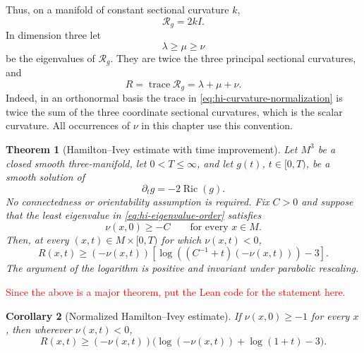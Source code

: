 \documentclass[10pt]{coll-l}
\newcommand{\trace}{\operatorname{trace}}
\newtheorem{theorem}{Theorem}[chapter]
\newtheorem{corollary}[theorem]{Corollary}
\theoremstyle{definition}
\theoremstyle{remark}
\numberwithin{section}{chapter}
\numberwithin{equation}{chapter}
\newcommand{\Ric}{\operatorname{Ric}}
\begin{document}
Thus, on a manifold of constant sectional curvature $k$,
\[
             \mathcal R_g=2kI.
\]
In dimension three let
\begin{equation}
        \lambda\geq\mu\geq\nu                             \label{eq:hi-eigenvalue-order}
\end{equation}
be the eigenvalues of $\mathcal R_g$.  They are twice the three principal
sectional curvatures, and
\begin{equation}
        R=\trace\mathcal R_g=\lambda+\mu+\nu.              \label{eq:hi-trace-is-scalar}
\end{equation}
Indeed, in an orthonormal basis the trace in
\eqref{eq:hi-curvature-normalization} is twice the sum of the three
coordinate sectional curvatures, which is the scalar curvature.  All
occurrences of $\nu$ in this chapter use this convention.

\begin{theorem}[Hamilton--Ivey estimate with time improvement]
\label{thm:hamilton-ivey-scaled}
Let $M^3$ be a closed smooth three-manifold, let $0<T\leq\infty$, and let
$g(t)$, $t\in[0,T)$, be a smooth solution of
\[
                 \partial_tg=-2\Ric(g).
\]
No connectedness or orientability assumption is required.  Fix $C>0$ and
suppose that the least eigenvalue in
\eqref{eq:hi-eigenvalue-order} satisfies
\begin{equation}
                 \nu(x,0)\geq-C
                 \qquad\text{for every }x\in M.            \label{eq:hi-initial-lower}
\end{equation}
Then, at every $(x,t)\in M\times[0,T)$ for which $\nu(x,t)<0$,
\begin{equation}
 R(x,t)\geq
 (-\nu(x,t))
 \left[
   \log\!\left((C^{-1}+t)(-\nu(x,t))\right)-3
 \right].                                                 \label{eq:hi-main-scaled}
\end{equation}
The argument of the logarithm is positive and invariant under parabolic
rescaling.
\end{theorem}

\textcolor{red}{Since the above is a major theorem, put the Lean code for the statement here.}

\begin{corollary}[Normalized Hamilton--Ivey estimate]
\label{cor:hamilton-ivey-normalized}
If $\nu(x,0)\geq-1$ for every $x$, then wherever $\nu(x,t)<0$,
\begin{equation}
 R(x,t)\geq
 (-\nu(x,t))
 \bigl(\log(-\nu(x,t))+\log(1+t)-3\bigr).                 \label{eq:hi-normalized}
\end{equation}
\end{corollary}
\end{document}
